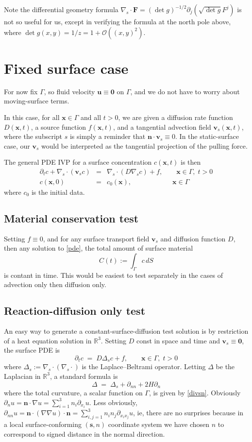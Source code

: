 \documentclass[11pt]{article}
\newcommand{\be}{\begin{equation}}
\newcommand{\ee}{\end{equation}}
\newcommand{\bea}{\begin{eqnarray}}
\newcommand{\eea}{\end{eqnarray}}
\newcommand{\mbf}[1]{{\mathbf #1}}
\newcommand{\bigO}{{\mathcal O}}
\newcommand{\qqquad}{\qquad\qquad}
\newcommand{\R}{\mathbb{R}}
\newcommand{\x}{\mbf{x}}
\newcommand{\n}{\mbf{n}}
\newcommand{\vv}{\mbf{v}}
\begin{document}
Note the differential geometry formula
$\nabla_s\cdot\mbf{F} = (\det g)^{-1/2} \partial_j (\sqrt{\det g} F^j)$
is not so useful for us, except in verifying the formula
at the north pole above, where $\det g(x,y) = 1/z = 1 + \bigO((x,y)^2)$.



\section{Fixed surface case}
\label{s:fixed}

For now fix $\Gamma$, so fluid velocity $\mbf{u}\equiv \mbf{0}$ on $\Gamma$,
and we do not have to worry about moving-surface terms.

In this case,
for all $\x\in\Gamma$ and all $t>0$,
we are given a diffusion rate function $D(\x,t)$,
a source function $f(\x,t)$,
and a tangential advection field $\vv_s(\x,t)$,
where the subscript $s$ is simply a reminder that
$\n\cdot\vv_s\equiv 0$.
In the static-surface case, our $\vv_s$ would be interpreted as the tangential
projection of the pulling force.

The general PDE IVP for a surface concentration $c(\x,t)$ is then
\bea
\partial_t c + \nabla_s \cdot(\vv_s c) &= &\nabla_s \cdot (D \nabla_s c) + f
, \qquad \x\in\Gamma, \;t>0
\label{pde}
\\
c(\x,0) & = & c_0(\x), \qqquad\qquad \x\in\Gamma
\label{ic}
\eea
where $c_0$ is the initial data.

\subsection{Material conservation test}

Setting $f\equiv0$, and for any surface transport
field $\vv_s$ and diffusion function $D$, then any solution to \eqref{pde},
the total amount of surface material
$$
C(t) := \int_\Gamma c \,dS
$$
is contant in time.
This would be easiest to test separately in the cases of advection
only then diffusion only.


\subsection{Reaction-diffusion only test}

An easy way to generate a constant-surface-diffusion test solution is
by restriction of a heat equation solution in $\R^3$.
Setting $D$ const in space and time and $\vv_s\equiv\mbf{0}$,
the surface PDE is
\be
\partial_t c \;=\;
D \Delta_s c + f
, \qquad \x\in\Gamma, \;t>0
\label{surfheat}
\ee
where $\Delta_s := \nabla_s\cdot (\nabla_s \cdot)$ is the Laplace--Beltrami
operator.
Letting $\Delta$ be the Laplacian in $\R^3$, a standard formula is
\be
\Delta \;=\; \Delta_s + \partial_{nn} + 2H \partial_n
\label{LB}
\ee
where the total curvature, a scalar function on $\Gamma$,
is given by \eqref{divsn}.
Obviously
$\partial_{n} u= \n \cdot \nabla u = \sum_{i=1}^3 n_i \partial_{x_i} u$.
Less obviously,
$\partial_{nn} u= \n\cdot (\nabla\nabla u) \cdot \n = \sum_{i,j=1}^3 n_i n_j \partial_{x_ix_j} u$, ie, there are no surprises because in a local surface-conforming $(\mbf{s},n)$
coordinate system we have chosen $n$ to correspond to signed distance in the
normal direction.
\end{document}
